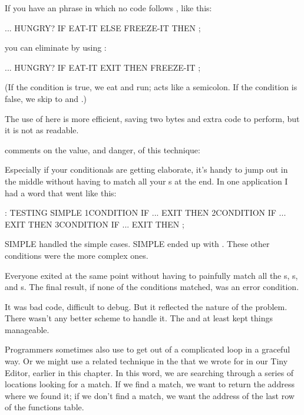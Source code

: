 If you have an  phrase in which no code follows
, like this:

\begin{Code}
... HUNGRY?  IF  EAT-IT  ELSE  FREEZE-IT  THEN ;
\end{Code}
you can eliminate  by using :

\begin{Code}
... HUNGRY?  IF EAT-IT EXIT  THEN  FREEZE-IT ;
\end{Code}
(If the condition is true, we eat and run;  acts like a semicolon.
If the condition is false, we skip to  and .)

The use of  here is more efficient, saving two bytes and extra
code to perform, but it is not as readable.%

\begin{interview}
 comments on the value, and danger, of this technique:
\begin{tfquot}
Especially if your conditionals are getting elaborate, it's handy to jump out
in the middle without having to match all your s at the end. In one
application I had a word that went like this:

\begin{Code}
: TESTING
   SIMPLE  1CONDITION IF ... EXIT THEN
           2CONDITION IF ... EXIT THEN
           3CONDITION IF ... EXIT THEN ;
\end{Code}
SIMPLE handled the simple cases. SIMPLE ended up with .
These other conditions were the more complex ones.

Everyone exited at the same point without having to painfully match all
the s, s, and s. The final result, if none of the
conditions matched, was an error condition.

It was bad code, difficult to debug. But it reflected the nature of the
problem. There wasn't any better scheme to handle it. The  and
 at least kept things manageable.
\end{tfquot}
\end{interview}
Programmers sometimes also use  to get out of a complicated
 loop in a graceful way. Or we might use a related technique in the
 that we wrote for  in our Tiny Editor, earlier in
this chapter. In this word, we are searching through a series of locations
looking for a match. If we find a match, we want to return the address
where we found it; if we don't find a match, we want the address of the
last row of the functions table.

